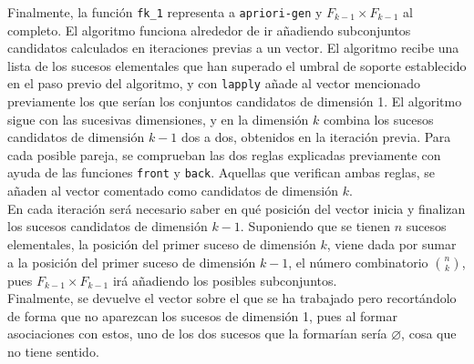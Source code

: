 \documentclass[12pt]{report}\usepackage[]{graphicx}\usepackage[dvipsnames]{xcolor}
\begin{document}
			Finalmente, la función \texttt{fk\_1} representa a \texttt{apriori-gen} y $F_{k-1} \times F_{k-1}$ al completo. El algoritmo funciona alrededor de ir añadiendo subconjuntos candidatos calculados en iteraciones previas a un vector. El algoritmo recibe una lista de los sucesos elementales que han superado el umbral de soporte establecido en el paso previo del algoritmo, y con \texttt{lapply} añade al vector mencionado previamente los que serían los conjuntos candidatos de dimensión 1. El algoritmo sigue con las sucesivas dimensiones, y en la dimensión $k$ combina los sucesos candidatos de dimensión $k-1$ dos a dos, obtenidos en la iteración previa. Para cada posible pareja, se comprueban las dos reglas explicadas previamente con ayuda de las funciones \texttt{front} y \texttt{back}. Aquellas que verifican ambas reglas, se añaden al vector comentado como candidatos de dimensión $k$. \\
			
			En cada iteración será necesario saber en qué posición del vector inicia y finalizan los sucesos candidatos de dimensión $k-1$. Suponiendo que se tienen $n$ sucesos elementales, la posición del primer suceso de dimensión $k$, viene dada por sumar a la posición del primer suceso de dimensión $k-1$, el número combinatorio $\binom{n}{k}$, pues $F_{k-1} \times F_{k-1}$ irá añadiendo los posibles subconjuntos. \\
			
			Finalmente, se devuelve el vector sobre el que se ha trabajado pero recortándolo de forma que no aparezcan los sucesos de dimensión 1, pues al formar asociaciones con estos, uno de los dos sucesos que la formarían sería $\varnothing$, cosa que no tiene sentido. 
			
\end{document}
